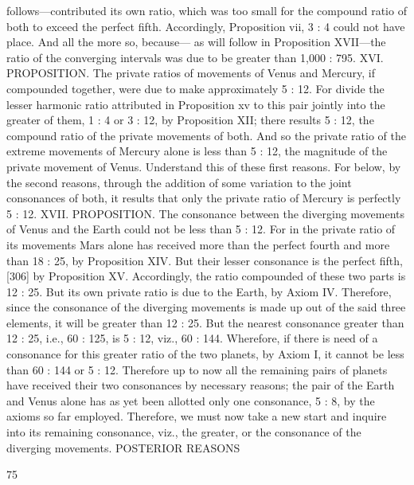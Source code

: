 \documentclass{article}
\begin{document}
follows—contributed its own ratio, which was too small for the
compound ratio of both to exceed the perfect fifth. Accordingly,
Proposition vii, 3 : 4 could not have place. And all the more so, because—
as will follow in Proposition XVII—the ratio of the converging intervals
was due to be greater than 1,000 : 795.
XVI. PROPOSITION. The private ratios of movements of Venus and
Mercury, if compounded together, were due to make approximately 5 :
12.
For divide the lesser harmonic ratio attributed in Proposition xv to this
pair jointly into the greater of them, 1 : 4 or 3 : 12, by Proposition XII;
there results 5 : 12, the compound ratio of the private movements of
both. And so the private ratio of the extreme movements of Mercury
alone is less than 5 : 12, the magnitude of the private movement of
Venus. Understand this of these first reasons. For below, by the second
reasons, through the addition of some variation to the joint consonances
of both, it results that only the private ratio of Mercury is perfectly 5 : 12.
XVII. PROPOSITION. The consonance between the diverging
movements of Venus and the Earth could not be less than 5 : 12.
For in the private ratio of its movements Mars alone has received more
than the perfect fourth and more than 18 : 25, by Proposition XIV. But
their lesser consonance is the perfect fifth, [306] by Proposition XV.
Accordingly, the ratio compounded of these two parts is 12 : 25. But its
own private ratio is due to the Earth, by Axiom IV. Therefore, since the
consonance of the diverging movements is made up out of the said three
elements, it will be greater than 12 : 25. But the nearest consonance
greater than 12 : 25, i.e., 60 : 125, is 5 : 12, viz., 60 : 144. Wherefore, if
there is need of a consonance for this greater ratio of the two planets, by
Axiom I, it cannot be less than 60 : 144 or 5 : 12.
Therefore up to now all the remaining pairs of planets have received
their two consonances by necessary reasons; the pair of the Earth and
Venus alone has as yet been allotted only one consonance, 5 : 8, by the
axioms so far employed. Therefore, we must now take a new start and
inquire into its remaining consonance, viz., the greater, or the
consonance of the diverging movements.
POSTERIOR REASONS


75
\end{document}

